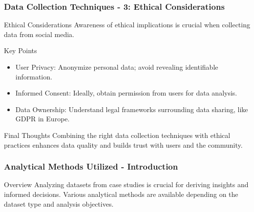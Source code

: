 \documentclass{beamer}
\begin{document}
\begin{frame}
    \frametitle{Data Collection Techniques - 3: Ethical Considerations}
    \begin{block}{Ethical Considerations}
        Awareness of ethical implications is crucial when collecting data from social media.
    \end{block}

    \begin{block}{Key Points}
        \begin{itemize}
            \item User Privacy: Anonymize personal data; avoid revealing identifiable information.
            \item Informed Consent: Ideally, obtain permission from users for data analysis.
            \item Data Ownership: Understand legal frameworks surrounding data sharing, like GDPR in Europe.
        \end{itemize}
    \end{block}

    \begin{block}{Final Thoughts}
        Combining the right data collection techniques with ethical practices enhances data quality and builds trust with users and the community.
    \end{block}
\end{frame}

\begin{frame}[fragile]
    \frametitle{Analytical Methods Utilized - Introduction}
    \begin{block}{Overview}
        Analyzing datasets from case studies is crucial for deriving insights and informed decisions. 
        Various analytical methods are available depending on the dataset type and analysis objectives.
    \end{block}
\end{frame}
\end{document}

